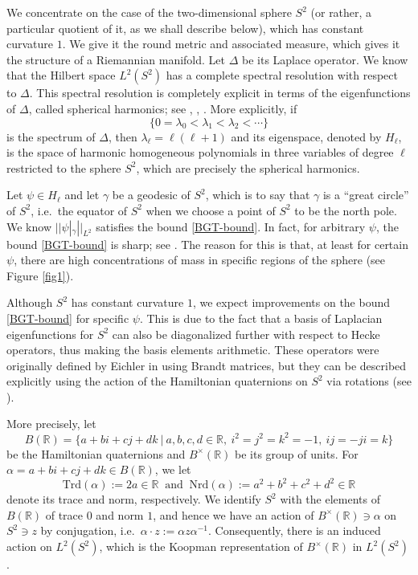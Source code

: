 \documentclass[11pt]{amsart}
\newcommand{\R}{\mathbb{R}}
\theoremstyle{definition}
\theoremstyle{remark}
\begin{document}
We concentrate on the case of the two-dimensional sphere $S^2$ (or rather, a particular quotient of it, as we shall describe below), which has constant curvature $1$. We give it the round metric and associated measure, which gives it the structure of a Riemannian manifold. Let $\Delta$ be its Laplace operator. We know that the Hilbert space $L^2(S^2)$ has a complete spectral resolution with respect to $\Delta$. This spectral resolution is completely explicit in terms of the eigenfunctions of $\Delta$, called spherical harmonics; see \cite[Thm. 2.9]{SpectrumLaplacian}, \cite[p. 140]{SteinWeiss}, \cite[Th. 2.34, Prop. 3.5]{SpheHar}. More explicitly, if $$\{0 = \lambda_0 < \lambda_1 < \lambda_2 < \cdots \}$$ is the spectrum of $\Delta$, then $\lambda_\ell = \ell(\ell+1)$ and its eigenspace, denoted by $H_\ell$, is the space of harmonic homogeneous polynomials in three variables of degree $\ell$ restricted to the sphere $S^2$, which are precisely the spherical harmonics. 

Let $\psi \in H_\ell$ and let $\gamma$ be a geodesic of $S^2$, which is to say that $\gamma$ is a ``great circle'' of $S^2$, i.e.~the equator of $S^2$ when we choose a point of $S^2$ to be the north pole. We know $||\psi|_{\gamma}||_{L^2}$ satisfies the bound \eqref{BGT-bound}. In fact, for arbitrary $\psi$, the bound \eqref{BGT-bound} is sharp; see \cite[Thm. 1]{BGTGeneralBound}. The reason for this is that, at least for certain $\psi$, there are high concentrations of mass in specific regions of the sphere (see Figure \ref{fig1}). 

Although $S^2$ has constant curvature $1$, we expect improvements on the bound \eqref{BGT-bound} for specific $\psi$. This is due to the fact that a basis of Laplacian eigenfunctions for $S^2$ can also be diagonalized further with respect to Hecke operators, thus making the basis elements arithmetic. These operators were originally defined by Eichler in \cite{EichlerHeckeOp} using Brandt matrices, but they can be described explicitly using the action of the Hamiltonian quaternions on $S^2$ via rotations (see \cite[\S 3.1]{ConwaySmith}). %

More precisely, let $$B(\mathbb{R}) = \{ a + bi + cj + dk \: | \: a,b,c,d\in \mathbb{R}, \: i^2=j^2=k^2=-1, \: ij=-ji=k \}$$ be the Hamiltonian quaternions and $B^{\times}(\mathbb{R})$ be its group of units. For $\alpha = a+bi+cj+dk \in B(\mathbb{R})$, we let $$\mathrm{Trd}(\alpha) := 2a \in \mathbb{R} \: \text{ and } \: \mathrm{Nrd}(\alpha) := a^2+b^2+c^2+d^2 \in \mathbb{R}$$ denote its trace and norm, respectively. We identify $S^2$ with the elements of $B(\mathbb{R})$ of trace $0$ and norm $1$, and hence we have an action of $B^{\times}(\mathbb{R})\ni \alpha$ on $S^2 \ni z$ by conjugation, i.e.~$\alpha \cdot z := \alpha z \alpha^{-1}$. Consequently, there is an induced action on $L^2(S^2)$, which is the Koopman representation of $B^{\times}(\R)$ in $L^2(S^2)$. 
\end{document}

